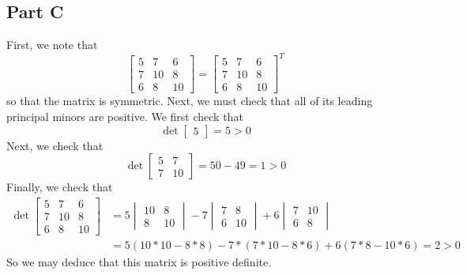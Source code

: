 \documentclass[12pt]{article}
\begin{document}
\subsection*{Part C}
 First, we note that
\[
\begin{bmatrix}
5 & 7 & 6\\
7 & 10 & 8\\
6 & 8 & 10
\end{bmatrix} =
 \begin{bmatrix}
5 & 7 & 6\\
7 & 10 & 8\\
6 & 8 & 10
\end{bmatrix}^T
\] so that the matrix is symmetric. Next, we must check that all of its leading principal minors are positive. We first check that
\[
\det \begin{bmatrix}
5
\end{bmatrix} = 5 > 0
\] Next, we check that
\[
\det \begin{bmatrix}
5 & 7\\
7 & 10
\end{bmatrix} = 50 - 49 = 1 > 0
\] Finally, we check that
\begin{align*}
\det \begin{bmatrix}
5 & 7 & 6\\
7 & 10 & 8\\
6 & 8 & 10
\end{bmatrix} &= 
5 \begin{vmatrix}
10 & 8\\
8 & 10
\end{vmatrix} - 
7 \begin{vmatrix}
7 & 8\\
6 & 10
\end{vmatrix} + 
6 \begin{vmatrix}
7 & 10\\
6 & 8
\end{vmatrix}\\
&= 5(10*10-8*8) - 7*(7*10-8*6) + 6(7*8 - 10 *6) = 2 > 0
\end{align*} So we may deduce that this matrix is positive definite.
\end{document}
